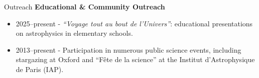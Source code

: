 \documentclass{resume} %
\begin{document}
\begin{rSection}{Outreach}
\textbf{Educational \& Community Outreach}
\begin{itemize}
  \item 2025–present - \textit{“Voyage tout au bout de l'Univers”}: educational presentations on astrophysics in elementary schools.
  \item 2013–present - Participation in numerous public science events, including stargazing at Oxford and “Fête de la science” at the Institut d’Astrophysique de Paris (IAP).
\end{itemize}

\end{rSection}
\end{document}
